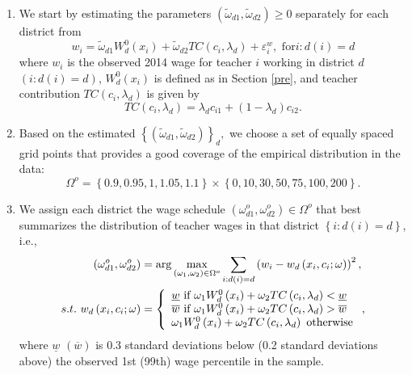 \documentclass[notitlepage,12pt]{article}%
\begin{document}
\begin{enumerate}
\item We start by estimating the parameters $\left(  \widetilde{\omega}%
_{d1},\widetilde{\omega}_{d2}\right)  \geq0$ separately for each district
from
\[
w_{i}=\widetilde{\omega}_{d1}W_{d}^{0}\left(  x_{i}\right)  +\widetilde{\omega
}_{d2}TC\left(  c_{i},\lambda_{d}\right)  +\varepsilon_{i}^{w},\text{ for
}i:d\left(  i\right)  =d
\]
where $w_{i}$ is the observed 2014 wage for teacher $i$ working in district
$d$ $\left(  i:d\left(  i\right)  =d\right)  $, $W_{d}^{0}\left(
x_{i}\right)  $ is defined as in Section \ref{pre}, and teacher contribution
$TC\left(  c_{i},\lambda_{d}\right)  $ is given by
\[
TC\left(  c_{i},\lambda_{d}\right)  =\lambda_{d}c_{i1}+\left(  1-\lambda
_{d}\right)  c_{i2}.
\]


\item Based on the estimated $\left\{  \left(  \widetilde{\omega}%
_{d1},\widetilde{\omega}_{d2}\right)  \right\}  _{d},$ we choose a set of
equally spaced grid points that provides a good coverage of the empirical
distribution in the data:
\[
\Omega^{o}=\left\{  0.9,0.95,1,1.05,1.1\right\}  \times\left\{
0,10,30,50,75,100,200\right\}  .
\]


\item We assign each district the wage schedule $(\omega_{d1}^{o},\omega
_{d2}^{o})\in\Omega^{o}$ that best summarizes the distribution of teacher
wages in that district $\left\{  i:d(i)=d\right\}  $, i.e.,
\begin{align*}
(\omega_{d1}^{o},\omega_{d2}^{o})  &  =\arg\max_{(\omega_{1},\omega_{2}%
)\in\Omega^{o}}\sum_{i:d(i)=d}\left(  w_{i}-w_{d}\left(  x_{i},c_{i}%
;\omega\right)  \right)  ^{2},\\
s.t.\text{ }w_{d}\left(  x_{i},c_{i};\omega\right)   &  =\left\{
\begin{array}
[c]{l}%
\underline{w}\text{ if }\omega_{1}W_{d}^{0}\left(  x_{i}\right)  +\omega
_{2}TC\left(  c_{i},\lambda_{d}\right)  <\underline{w}\\
\overline{w}\text{ if }\omega_{1}W_{d}^{0}\left(  x_{i}\right)  +\omega
_{2}TC\left(  c_{i},\lambda_{d}\right)  >\overline{w}\\
\omega_{1}W_{d}^{0}\left(  x_{i}\right)  +\omega_{2}TC\left(  c_{i}%
,\lambda_{d}\right)  \text{ otherwise}%
\end{array}
\right.  ,
\end{align*}
where $\underline{w}$ $\left(  \overline{w}\right)  $ is 0.3 standard
deviations below (0.2 standard deviations above) the observed 1st (99th) wage
percentile in the sample.


\end{enumerate}
\end{document}
